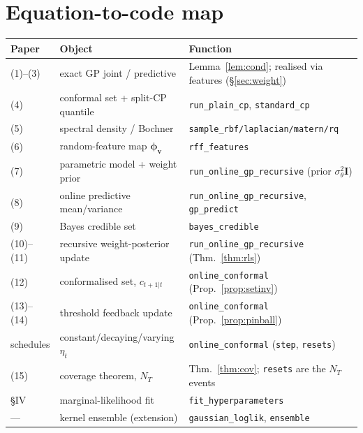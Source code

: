 \documentclass[11pt]{article}
\theoremstyle{plain}
\theoremstyle{definition}
\newcommand{\I}{\mathbf{I}}
\newcommand{\bphi}{\boldsymbol{\phi}}
\newcommand{\code}[1]{\texttt{#1}}
\begin{document}
\section{Equation-to-code map}\label{sec:map}
\begin{center}
\renewcommand{\arraystretch}{1.3}
\begin{tabular}{lll}
\hline
Paper & Object & Function\\
\hline
(1)--(3) & exact GP joint / predictive & Lemma~\ref{lem:cond}; realised via features (\S\ref{sec:weight})\\
(4) & conformal set + split-CP quantile & \code{run\_plain\_cp}, \code{standard\_cp}\\
(5) & spectral density / Bochner & \code{sample\_rbf/laplacian/matern/rq}\\
(6) & random-feature map $\bphi_{\mathbf v}$ & \code{rff\_features}\\
(7) & parametric model + weight prior & \code{run\_online\_gp\_recursive} (prior $\sigma_\theta^2\I$)\\
(8) & online predictive mean/variance & \code{run\_online\_gp\_recursive}, \code{gp\_predict}\\
(9) & Bayes credible set & \code{bayes\_credible}\\
(10)--(11) & recursive weight-posterior update & \code{run\_online\_gp\_recursive} (Thm.~\ref{thm:rls})\\
(12) & conformalised set, $c_{t+1|t}$ & \code{online\_conformal} (Prop.~\ref{prop:setinv})\\
(13)--(14) & threshold feedback update & \code{online\_conformal} (Prop.~\ref{prop:pinball})\\
schedules & constant/decaying/varying $\eta_t$ & \code{online\_conformal} (\code{step}, \code{resets})\\
(15) & coverage theorem, $N_T$ & Thm.~\ref{thm:cov}; \code{resets} are the $N_T$ events\\
\S IV & marginal-likelihood fit & \code{fit\_hyperparameters}\\
--- & kernel ensemble (extension) & \code{gaussian\_loglik}, \code{ensemble}\\
\hline
\end{tabular}
\end{center}
\end{document}
